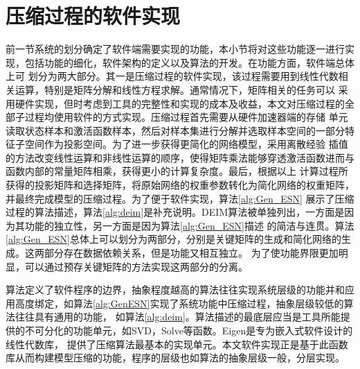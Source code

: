 \section{压缩过程的软件实现}
前一节系统的划分确定了软件端需要实现的功能，本小节将对这些功能逐一进行实现，包括功能的细化，软件架构的定义以及算法的开发。在功能方面，软件端总体上可
划分为两大部分。其一是压缩过程的软件实现，该过程需要用到线性代数相关运算，特别是矩阵分解和线性方程求解。通常情况下，矩阵相关的任务可以
采用硬件实现，但时考虑到工具的完整性和实现的成本及收益，本文对压缩过程的全部子过程均使用软件的方式实现。压缩过程首先需要从硬件加速器端的存储
单元读取状态样本和激活函数样本，然后对样本集进行分解并选取样本空间的一部分特征子空间作为投影空间。为了进一步获得更简化的网络模型，采用离散经验
插值的方法改变线性运算和非线性运算的顺序，使得矩阵乘法能够穿透激活函数进而与函数内部的常量矩阵相乘，获得更小的计算复杂度。最后，根据以上
计算过程所获得的投影矩阵和选择矩阵，将原始网络的权重参数转化为简化网络的权重矩阵，并最终完成模型的压缩过程。为了便于软件实现，算法\ref{alg:Gen_ESN}
展示了压缩过程的算法描述，算法\ref{alg:deim}是补充说明。DEIM算法被单独列出，一方面是因为其功能的独立性，另一方面是因为算法\ref{alg:Gen_ESN}描述
的简洁与连贯。算法\ref{alg:Gen_ESN}总体上可以划分为两部分，分别是关键矩阵的生成和简化网络的生成。这两部分存在数据依赖关系，但是功能又相互独立。
为了使功能界限更加明显，可以通过预存关键矩阵的方法实现这两部分的分离。


算法定义了软件程序的边界，抽象程度越高的算法往往实现系统层级的功能并和应用高度绑定，如算法\ref{alg:GenESN}实现了系统功能中压缩过程，抽象层级较低的算法往往具有通用的功能，
如算法\ref{alg:deim}。算法描述的最底层应当是工具所能提供的不可分化的功能单元，如SVD，Solve等函数。Eigen是专为嵌入式软件设计的线性代数库，
提供了压缩算法最基本的实现单元。本文软件实现正是基于此函数库从而构建模型压缩的功能，程序的层级也如算法的抽象层级一般，分层实现。

